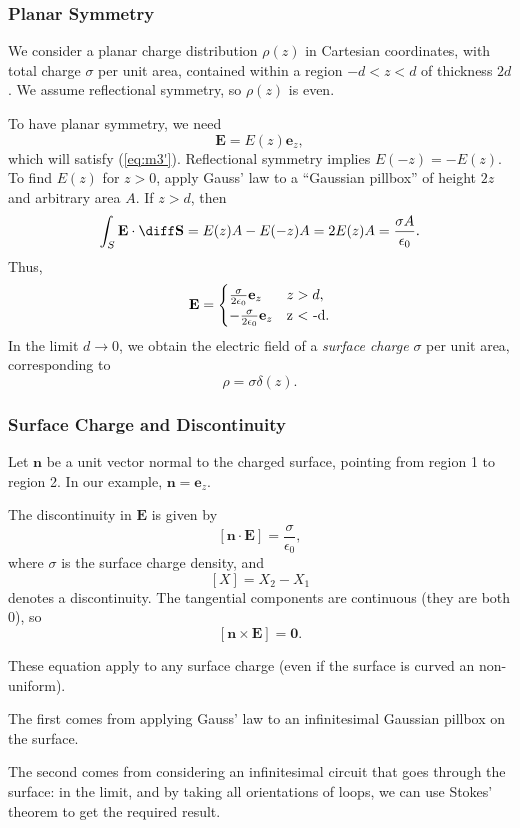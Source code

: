 \documentclass[12pt]{article}
\begin{document}
\subsubsection{Planar Symmetry}
\label{subsub:planar_symmetry}

We consider a planar charge distribution $\rho(z)$ in Cartesian coordinates, with total charge $\sigma$ per unit area, contained within a region $-d < z < d$ of thickness $2d$. We assume reflectional symmetry, so $\rho(z)$ is even.

To have planar symmetry, we need
\[
\mathbf{E} = E(z) \mathbf{e}_z
,\]
which will satisfy (\ref{eq:m3'}). Reflectional symmetry implies $E(-z) = -E(z)$. To find $E(z)$ for $z > 0$, apply Gauss' law to a ``Gaussian pillbox'' of height $2z$ and arbitrary area $A$. If $z > d$, then
\[
\int_{S}\mathbf{E} \cdot \diff \mathbf{S} = E(z)A - E(-z)A = 2E(z)A = \frac{\sigma A}{\epsilon_0}
.\]
Thus,
\[
\mathbf{E} =
\begin{cases}
	\frac{\sigma}{2 \epsilon_0} \mathbf{e}_z & z > d, \\
	-\frac{\sigma}{2 \epsilon_0} \mathbf{e}_z & $z < -d$.
\end{cases}
\]
In the limit $d \to 0$, we obtain the electric field of a \emph{surface charge} $\sigma$ per unit area, corresponding to
\[
\rho = \sigma \delta(z)
.\]

\subsubsection{Surface Charge and Discontinuity}
\label{subsub:surface_charge_and_discontinuity}

Let $\mathbf{n}$ be a unit vector normal to the charged surface, pointing from region 1 to region 2. In our example, $\mathbf{n} = \mathbf{e}_z$.

The discontinuity in $\mathbf{E}$ is given by
\[
	[\mathbf{n} \cdot \mathbf{E}] = \frac{\sigma}{\epsilon_0}
,\]
where $\sigma$ is the surface charge density, and
\[
	[X] = X_2 - X_1
\]
denotes a discontinuity. The tangential components are continuous (they are both 0), so
\[
	[\mathbf{n} \times \mathbf{E}] = \mathbf{0}
.\]

These equation apply to any surface charge (even if the surface is curved an non-uniform).

The first comes from applying Gauss' law to an infinitesimal Gaussian pillbox on the surface.

The second comes from considering an infinitesimal circuit that goes through the surface: in the limit, and by taking all orientations of loops, we can use Stokes' theorem to get the required result.
\end{document}
